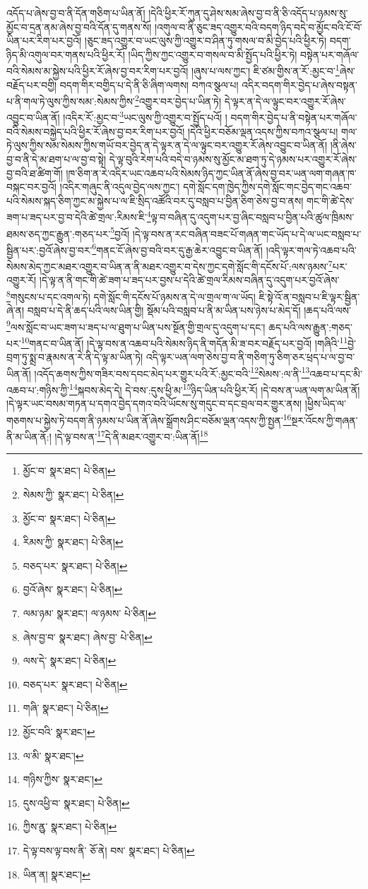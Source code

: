 འདོད་པ་ཞེས་བྱ་བ་ནི་དོན་གཅིག་པ་ཡིན་ནོ། །དེའི་ཕྱིར་རོ་ཀུན་དུ་ཤེས་སམ་ཞེས་བྱ་བ་ནི་ཅི་འདོད་པ་ཉམས་སུ་མྱོང་བ་དྲན་ནམ་ཞེས་བྱ་བའི་དོན་དུ་གནས་སོ། །འགུལ་བ་ནི་ཅུང་ཟད་འགྱུར་བའི་བདག་ཉིད་བདེ་བ་མྱོང་བའི་ངོ་བོ་ཡིན་པར་རིག་པར་བྱའོ། །ཅུང་ཟད་འགྱུར་བ་ཡང་ལུས་ཀྱི་འགྱུར་བ་ཤིན་ཏུ་གསལ་བ་མི་བྱེད་པའི་ཕྱིར་ཏེ། བདག་ཉིད་མི་འགུལ་བར་གནས་པའི་ཕྱིར་རོ། །ཡིད་ཀྱིས་ཀྱང་འགྱུར་བ་གསལ་བ་མི་སྤྱོད་པའི་ཕྱིར་ཏེ། བསྟེན་པར་གཞོལ་བའི་སེམས་མ་སྐྱེས་པའི་ཕྱིར་རོ་ཞེས་བྱ་བར་རིག་པར་བྱའོ། །ཞུས་པ་ལས་ཀྱང་། ཇི་ཙམ་གྱིས་ན་རོ་:མྱང་བ་\footnote{མྱོང་བ་  སྣར་ཐང་།  པེ་ཅིན། }ཞེས་བརྗོད་པར་བགྱི། བདག་གིར་བགྱིད་པ་དེ་ནི་ཅི་ཞིག་ལགས། བཀའ་སྩལ་པ། འདིར་བདག་གིར་བྱེད་པ་ཞེས་བསྟན་པ་ནི་གལ་ཏེ་ལུས་ཀྱིས་སམ་:སེམས་ཀྱིས་\footnote{སེམས་ཀྱི་  སྣར་ཐང་།  པེ་ཅིན། }འགྱུར་བར་བྱེད་པ་ཡིན་ཏེ། དེ་ལྟར་ན་དེ་ལ་ལྟུང་བར་འགྱུར་རོ་ཞེས་འབྱུང་བ་ཡིན་ནོ། །འདིར་རོ་:མྱང་བ་\footnote{མྱོང་བ་  སྣར་ཐང་།  པེ་ཅིན། }ཡང་ལུས་ཀྱི་འགྱུར་བ་སྤྱོད་པའོ། །
བདག་གིར་བྱེད་པ་ནི་བསྟེན་པར་གཞོལ་བའི་སེམས་བསྐྱེད་པའི་ཕྱིར་རོ་ཞེས་བྱ་བར་རིག་པར་བྱའོ། །དེའི་ཕྱིར་བཅོམ་ལྡན་འདས་ཀྱིས་བཀའ་སྩལ་པ། གལ་ཏེ་ལུས་ཀྱིས་སམ་སེམས་ཀྱིས་གཡོ་བར་བྱེད་ན་དེ་ལྟར་ན་དེ་ལ་ལྟུང་བར་འགྱུར་རོ་ཞེས་འབྱུང་བ་ཡིན་ནོ། །ནི་ཞེས་བྱ་བ་ནི་དེ་མ་ཐག་པ་ལ་བྱ་བ་སྟེ། དེ་ལྟ་བུའི་རེག་པའི་བདེ་བ་ཉམས་སུ་མྱོང་མ་ཐག་ཏུ་དེ་ཉམས་པར་འགྱུར་རོ་ཞེས་བྱ་བའི་ཐ་ཚིག་གོ། །ཁ་ཅིག་ན་རེ་འདིར་ཡང་འཆབ་པའི་སེམས་ཉིད་ཀྱང་ཡིན་ནོ་ཞེས་བྱ་བར་ཡན་ལག་གཞན་ཁ་བསྐང་བར་བྱའོ། །འདིར་གཞུང་ནི་འདུལ་བྱེད་ལས་ཀྱང་། དགེ་སློང་དག་ཁྱེད་ཀྱིས་དགེ་སློང་གང་བྱེད་གང་འཆབ་པའི་སེམས་སྐད་ཅིག་ཀྱང་མ་སྐྱེས་པ་ལ་ཇི་སྲིད་འཚོའི་བར་དུ་བསླབ་པ་བྱིན་ཅིག་ཅེས་བྱ་བ་ནས། གང་གི་ཚེ་དེས་ཟག་པ་ཟད་པར་བྱ་བ་དེའི་ཚེ་གྲལ་:རིམས་ཇི་\footnote{རིམས་ཀྱི་  སྣར་ཐང་།  པེ་ཅིན། }ལྟ་བ་བཞིན་དུ་འདུག་པར་བྱ་ཞིང་བསླབ་པ་བྱིན་པའི་ཚུལ་ཁྲིམས་ཐམས་ཅད་ཀྱང་རྒྱུན་:གཅད་པར་\footnote{བཅད་པར་  སྣར་ཐང་།  པེ་ཅིན། }བྱའོ། །དེ་ལྟ་བས་ན་རང་བཞིན་བཟང་པོ་གཞན་གང་ཡོད་པ་དེ་ལ་ཡང་བསླབ་པ་སྦྱིན་པར་:བྱའོ་ཞེས་བྱ་བར་\footnote{བྱའོ་ཞེས་  སྣར་ཐང་།  པེ་ཅིན། }གནང་ངོ་ཞེས་བྱ་བའི་བར་དུ་རྒྱ་ཆེར་འབྱུང་བ་ཡིན་ནོ། །འདི་ལྟར་གལ་ཏེ་འཆབ་པའི་སེམས་མེད་ཀྱང་མཐར་འགྱུར་བ་ཡིན་ན་ནི་མཐར་འགྱུར་བ་དེས་ཀྱང་དགེ་སློང་གི་དངོས་པོ་:ལས་ཉམས་\footnote{ལམ་ཉམ་  སྣར་ཐང་། ལ་ཉམས་  པེ་ཅིན། }པར་འགྱུར་རོ། །དེ་ལྟ་ན་ནི་གང་གི་ཚེ་ཟག་པ་ཟད་པར་བྱས་པ་དེའི་ཚེ་གྲལ་རིམས་བཞིན་དུ་འདུག་པར་བྱའོ་ཞེས་\footnote{ཞེས་བྱ་བ་  སྣར་ཐང་། ཞེས་བྱ་  པེ་ཅིན། }གསུངས་པ་དང་འགལ་ཏེ། དགེ་སློང་གི་དངོས་པོ་ཉམས་ན་དེ་ལ་གྲལ་ག་ལ་ཡོད། ཇི་སྟེ་འོ་ན་བསླབ་པ་ཇི་ལྟར་སྦྱིན་ཞེ་ན། བསླབ་པ་དེ་ནི་ཆད་པའི་ལས་ཡིན་གྱི། སྡོམ་པའི་བསླབ་པ་ནི་མ་ཡིན་པས་ཉེས་པ་མེད་དོ། །ཆད་པའི་ལས་\footnote{ལས་དེ་  སྣར་ཐང་།  པེ་ཅིན། }ལས་སློང་བ་ཡང་ཟག་པ་ཟད་པ་ལ་ཐུག་པ་ཡིན་པས་སྔོན་གྱི་གྲལ་དུ་འདུག་པ་དང་། ཆད་པའི་ལས་རྒྱུན་:གཅད་པར་\footnote{བཅད་པར་  སྣར་ཐང་།  པེ་ཅིན། }གནང་བ་ཡིན་ནོ། །དེ་ལྟ་བས་ན་འཆབ་པའི་སེམས་ཉིད་ནི་གདོན་མི་ཟ་བར་བརྗོད་པར་བྱའོ། །གཞིའི་\footnote{གཞི་  སྣར་ཐང་།  པེ་ཅིན། }བྱེ་བྲག་ཏུ་སྨྲ་བ་རྣམས་ན་རེ་ནི་དེ་ལྟ་མ་ཡིན་ཏེ། འདི་ལྟར་ཡན་ལག་ཅེས་བྱ་བ་ནི་གཅིག་ཏུ་ཅིག་ཅར་ཕྲད་པ་ལ་བྱ་བ་ཡིན་ནོ། །འདོད་ཆགས་ཀྱིས་གཟིར་བས་དབང་མེད་པར་གྱུར་པའི་རོ་:མྱང་བའི་\footnote{མྱོང་བའི་  སྣར་ཐང་། }སེམས་:ལ་ནི་\footnote{ལ་མི་  སྣར་ཐང་། }འཆབ་པ་དང་མི་འཆབ་པ་:གཉིས་ཀྱི་\footnote{གཉིས་ཀྱིས་  སྣར་ཐང་། }སྐབས་མེད་དེ། དེ་བས་:དུས་ཕྱི་མ་\footnote{དུས་འཕྱི་བ་  སྣར་ཐང་།  པེ་ཅིན། }ཉིད་ཡིན་པའི་ཕྱིར་རོ། །དེ་བས་ན་ཡན་ལག་མ་ཡིན་ནོ། །དེ་ལྟར་ཡང་བསམ་གཏན་པ་དགའ་བྱེད་དགའ་བའི་ཡོངས་སུ་གདུང་བ་དང་བྲལ་བར་གྱུར་ནས། །ཕྱིས་ཡིད་ལ་གཅགས་པ་སྐྱེས་ཏེ་བདག་ནི་ཉམས་པ་ཡིན་ནོ་ཞེས་སྒྲོགས་ཤིང་བཅོམ་ལྡན་འདས་ཀྱི་སྤྱན་\footnote{ཀྱིས་ྱན་  སྣར་ཐང་།  པེ་ཅིན། }སྔར་འོངས་ཀྱི་གཞན་ནི་མ་ཡིན་ནོ:། །དེ་ལྟ་བས་ན་\footnote{དེ་ལྟ་བས་ལྟ་བས་ནི་  ཅོ་ནེ། བས་  སྣར་ཐང་།  པེ་ཅིན། }དེ་ནི་མཐར་འགྱུར་བ་:ཡིན་ནོ།\footnote{ཡིན་ན།  སྣར་ཐང་། } 